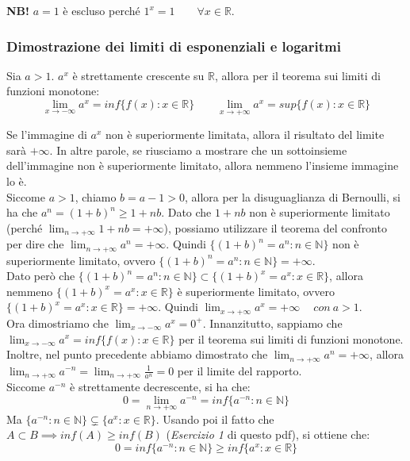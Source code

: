 \documentclass{article}
\begin{document}
\noindent\textbf{NB!} $a = 1$ è escluso perché $1^x = 1 \qquad \forall x \in \mathbb{R}$.

\subsubsection{Dimostrazione dei limiti di esponenziali e logaritmi}
Sia $a > 1$. $a^x$ è strettamente crescente su $\mathbb{R}$, allora per il teorema sui limiti di funzioni monotone:
\begin{equation*}
    \lim_{x \to -\infty} a^x = inf\{f(x) : x \in \mathbb{R}\} \qquad \lim_{x \to +\infty} a^x = sup\{f(x) : x \in \mathbb{R}\}
\end{equation*}

\noindent Se l'immagine di $a^x$ non è superiormente limitata, allora il risultato del limite sarà $+\infty$. In altre parole, se riusciamo a mostrare che un sottoinsieme dell'immagine non è superiormente limitato, allora nemmeno l'insieme immagine lo è. \\
Siccome $a > 1$, chiamo $b = a - 1 > 0$, allora per la disuguaglianza di Bernoulli, si ha che $a^n = (1 + b)^n \geq 1 + nb$. Dato che $1 + nb$ non è superiormente limitato (perché $\lim_{n \to +\infty} 1 + nb = +\infty$), possiamo utilizzare il teorema del confronto per dire che $\lim_{n \to +\infty} a^n = +\infty$. Quindi $\{(1 + b)^n = a^n : n \in \mathbb{N}\}$ non è superiormente limitato, ovvero $\{(1 + b)^n = a^n : n \in \mathbb{N}\} = + \infty$.\\
Dato però che $\{(1 + b)^n = a^n : n \in \mathbb{N}\} \subset \{(1 + b)^x = a^x : x \in \mathbb{R}\}$, allora nemmeno $\{(1 + b)^x = a^x : x \in \mathbb{R}\}$ è superiormente limitato, ovvero $\{(1 + b)^x = a^x : x \in \mathbb{R}\} = +\infty$. Quindi $\lim_{x \to +\infty} a^x = + \infty \quad \ con \ a > 1$.\\
Ora dimostriamo che $\lim_{x \to - \infty} a^x = 0^+$. Innanzitutto, sappiamo che $\lim_{x \to - \infty} a^x = inf\{f(x) : x \in \mathbb{R}\}$ per il teorema sui limiti di funzioni monotone. Inoltre, nel punto precedente abbiamo dimostrato che $\lim_{n \to +\infty} a^n = +\infty$, allora $\lim_{n \to +\infty} a^{-n} = \lim_{n \to +\infty} \frac{1}{a^n} = 0$ per il limite del rapporto.\\
Siccome $a^{-n}$ è strettamente decrescente, si ha che:
\begin{equation*}
    0 = \lim_{n \to +\infty} a^{-n} = inf\{a^{-n} : n \in \mathbb{N}\}
\end{equation*}
Ma $\{a^{-n} : n \in \mathbb{N}\} \subsetneq \{a^x : x \in \mathbb{R}\}$. Usando poi il fatto che $A \subset B \implies inf(A) \geq inf(B)$ (\textit{Esercizio 1} di questo pdf), si ottiene che:
\begin{equation*}
    0 = inf\{a^{-n} : n \in \mathbb{N}\} \geq inf\{a^x : x \in \mathbb{R}\}
\end{equation*}
\end{document}
